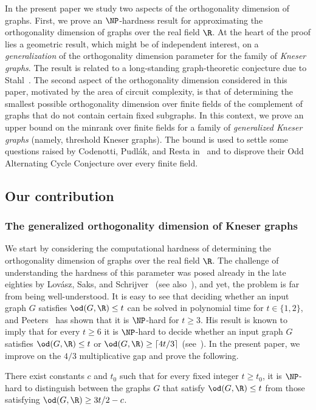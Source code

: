 %
In the present paper we study %
two aspects of the orthogonality dimension of graphs.
First, we prove an $\NP$-hardness result for approximating the orthogonality dimension of graphs over the real field $\R$.
At the heart of the proof lies a geometric result, which might be of independent interest, on a \emph{generalization}
of the orthogonality dimension parameter for the family of \emph{Kneser graphs}. The result is related to a long-standing graph-theoretic conjecture due to Stahl~\cite{Stahl76}.
The second aspect of the orthogonality dimension
%
%
considered in this %
paper,  %
motivated by the area of circuit complexity, is that of determining the smallest possible orthogonality dimension  over finite fields of the complement of graphs that do not contain certain fixed subgraphs. In this context, we prove %
an upper bound  %
on the minrank
%
%
over finite fields for 
%
%
a family of \emph{generalized Kneser graphs} (namely, threshold Kneser graphs).
The bound is used to settle %
some %
questions raised by Codenotti, Pudl{\'{a}}k, and Resta in~\cite{CodenottiPR00}
and to disprove their Odd Alternating Cycle Conjecture over every finite field.

\subsection{Our contribution}

\subsubsection{The generalized orthogonality dimension of Kneser graphs}

We start by considering the computational hardness of determining the orthogonality dimension of graphs over the real field $\R$.
The challenge of understanding the hardness of this parameter was posed already in the late eighties by Lov\'asz, Saks, and Schrijver~\cite{LovaszSS89} (see also~\cite[Chapter~10]{LovaszBook}), and yet, the problem is far from being well-understood.
It is easy to see that deciding whether an input graph $G$ satisfies $\od(G,\R) \leq t$ can be solved in polynomial
%
%
time  %
for $t \in \{1,2\}$, and Peeters~\cite{Peeters96} has shown that it is $\NP$-hard for $t \geq 3$.
His result is known to imply that for every $t \geq 6$ it is $\NP$-hard to decide whether an input graph $G$ satisfies $\od(G,\R) \leq t$ or $\od(G,\R) \geq \lceil 4t/3 \rceil$ (see~\cite{HavivMFCS19}).
In the %
present paper,  %
we improve on the $4/3$ multiplicative gap and prove the following.
%
%
%
%
%
%
%
%
\begin{theorem}\label{thm:IntroHardness}
There exist constants $c$ and $t_0$ such that for every fixed integer $t \geq t_0$, it is $\NP$-hard to distinguish between the graphs $G$ that satisfy $\od(G,\R) \leq t$ from those satisfying $\od(G,\R) \geq 3t/2-c$.
\end{theorem}
%

